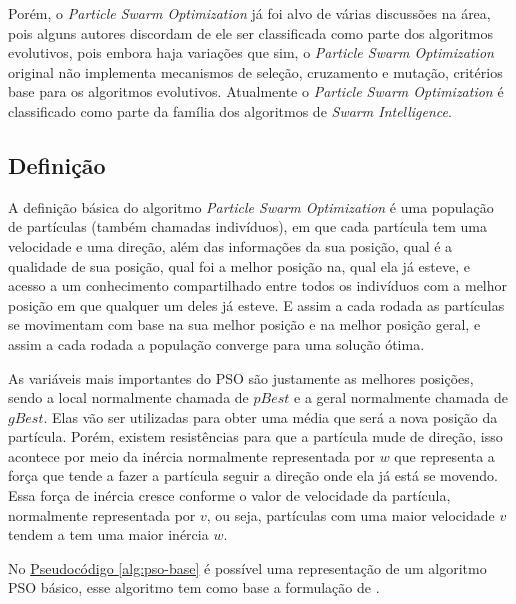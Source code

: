         Porém, o \textit{Particle Swarm Optimization} já foi alvo de várias discussões na área, pois alguns autores discordam de ele ser classificada como parte dos algoritmos evolutivos, pois embora haja variações que sim, o \textit{Particle Swarm Optimization} original não implementa mecanismos de seleção, cruzamento e mutação, critérios base para os algoritmos evolutivos.\newline
        Atualmente o \textit{Particle Swarm Optimization} é classificado como parte da família dos algoritmos de \textit{Swarm Intelligence}.


    \subsection{Definição}
        A definição básica do algoritmo \textit{Particle Swarm Optimization} é uma população de partículas (também chamadas indivíduos), em que cada partícula tem uma velocidade e uma direção, além das informações da sua posição, qual é a qualidade de sua posição, qual foi a melhor posição na, qual ela já esteve, e acesso a um conhecimento compartilhado entre todos os indivíduos com a melhor posição em que qualquer um deles já esteve. E assim a cada rodada as partículas se movimentam com base na sua melhor posição e na melhor posição geral, e assim a cada rodada a população converge para uma solução ótima.\hfill\vspace{\onelineskip}
        
        As variáveis mais importantes do PSO são justamente as melhores posições, sendo a local normalmente chamada de $pBest$ e a geral normalmente chamada de $gBest$. Elas vão ser utilizadas para obter uma média que será a nova posição da partícula. Porém, existem resistências para que a partícula mude de direção, isso acontece por meio da inércia normalmente representada por $w$ que representa a força que tende a fazer a partícula seguir a direção onde ela já está se movendo. Essa força de inércia cresce conforme o valor de velocidade da partícula, normalmente representada por $v$, ou seja, partículas com uma maior velocidade $v$ tendem a tem uma maior inércia $w$.\hfill\vspace{\onelineskip}
        
        No \hyperref[alg:pso-base]{Pseudocódigo \ref{alg:pso-base}} 
        é possível uma representação de um algoritmo PSO básico, esse algoritmo tem como base a formulação de \cite{martinez2009}.
        
